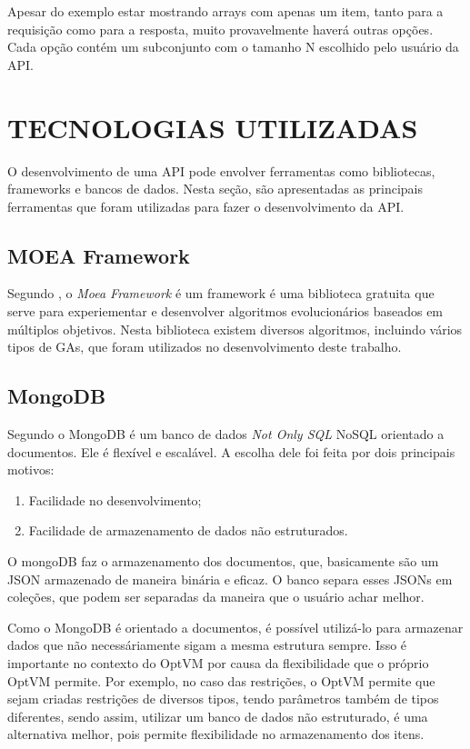 Apesar do exemplo estar mostrando arrays com apenas um item,
tanto para a requisição como para a resposta, muito provavelmente 
haverá outras opções. Cada opção contém um subconjunto com o tamanho
N escolhido pelo usuário da API. 

\section{TECNOLOGIAS UTILIZADAS}

O desenvolvimento de uma API pode envolver ferramentas como bibliotecas, frameworks e 
bancos de dados. Nesta seção, são apresentadas as principais ferramentas que foram utilizadas para
fazer o desenvolvimento da API. 

\subsection{MOEA Framework}
Segundo \cite{moea}, o \textit{Moea Framework} é um framework é uma
biblioteca gratuita que serve para experiementar e desenvolver
algoritmos evolucionários baseados em múltiplos objetivos. Nesta biblioteca
existem diversos algoritmos, incluindo vários tipos de GAs, que foram utilizados
no desenvolvimento deste trabalho.

\subsection{MongoDB}
Segundo \cite{chodorow2013mongodb} o MongoDB é um banco de dados 
\textit{Not Only SQL} NoSQL orientado a documentos. Ele é flexível e escalável. 
A escolha dele foi feita por dois principais motivos:

\begin{enumerate}
  \item Facilidade no desenvolvimento;
  \item Facilidade de armazenamento de dados não estruturados.
\end{enumerate}

O mongoDB faz o armazenamento dos documentos, que, basicamente são um JSON
armazenado de maneira binária e eficaz. O banco separa esses JSONs em coleções,
que podem ser separadas da maneira que o usuário achar melhor.

Como o MongoDB é orientado a documentos, é possível utilizá-lo para armazenar
dados que não necessáriamente sigam a mesma estrutura sempre. Isso é importante no contexto do
OptVM por causa da flexibilidade que o próprio OptVM permite. Por exemplo, no
caso das restrições, o OptVM permite que sejam criadas restrições de diversos tipos,
tendo parâmetros também de tipos diferentes, sendo assim, utilizar um banco de 
dados não estruturado, é uma alternativa melhor, pois permite flexibilidade no armazenamento
dos itens.
